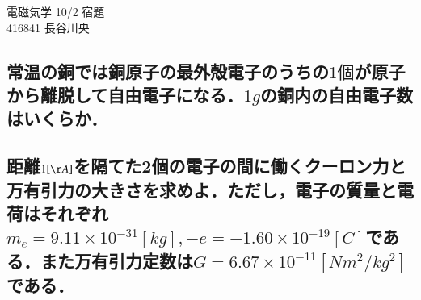 \documentclass[a4j,12pt]{jsarticle}
\begin{document}
\begin{center}
    \begin{LARGE}
        {\huge 電磁気学 10/2 宿題}\vspace{0.2em}\\ 416841 長谷川央
    \end{LARGE}
\end{center}

\subsection{常温の銅では銅原子の最外殻電子のうちの\(1個\)が原子から離脱して自由電子になる．\(1g\)の銅内の自由電子数はいくらか．}

\vspace{20em}
\subsection{距離\(1[\AA]\)を隔てた2個の電子の間に働くクーロン力と万有引力の大きさを求めよ．ただし，電子の質量と電荷はそれぞれ \(m_e=9.11\times10^{-31}[kg], -e=-1.60\times10^{-19}[C]\)である．また万有引力定数は\(G=6.67\times10^{-11}[Nm^2/kg^2]\)である．}
\end{document}
